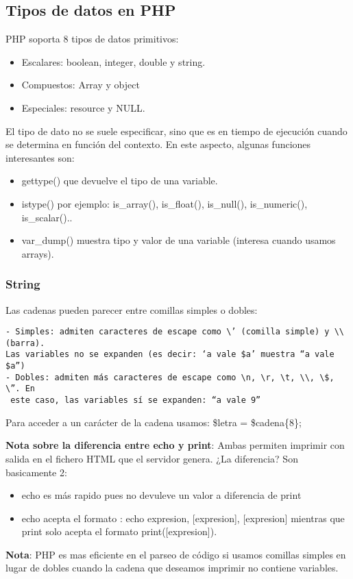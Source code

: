 \documentclass{apuntes}
\begin{document}
\subsection{Tipos de datos en PHP}
PHP soporta 8 tipos de datos primitivos:
\begin{itemize}
\item Escalares: boolean, integer, double y string.
\item Compuestos: Array y object
\item Especiales: resource y NULL.
\end{itemize}
El tipo de dato no se suele especificar, sino que es en tiempo de ejecución cuando se determina en función del contexto. En este aspecto, algunas funciones interesantes son:
\begin{itemize}
\item gettype() que devuelve el tipo de una variable.
\item istype() por ejemplo: is\_array(), is\_float(), is\_null(), is\_numeric(), is\_scalar()..
\item var\_dump() muestra tipo y valor de una variable (interesa cuando usamos arrays).
\end{itemize}

\subsubsection{String}
Las cadenas pueden parecer entre comillas simples o dobles:
\begin{verbatim}
- Simples: admiten caracteres de escape como \’ (comilla simple) y \\ (barra).
Las variables no se expanden (es decir: ‘a vale $a’ muestra “a vale $a”)
- Dobles: admiten más caracteres de escape como \n, \r, \t, \\, \$, \”. En
 este caso, las variables sí se expanden: “a vale 9”
\end{verbatim}

Para acceder a un carácter de la cadena usamos: \$letra = \$cadena\{8\};

\textbf{Nota sobre la diferencia entre echo y print}:
Ambas permiten imprimir con salida en el fichero HTML que el servidor genera. ¿La diferencia? Son basicamente 2:
\begin{itemize}
\item echo es más rapido pues no devuleve un valor a diferencia de print
\item echo acepta el formato : echo expresion, [expresion], [expresion] mientras que print solo acepta el formato print([expresion]).
\end{itemize}
\textbf{Nota}: PHP es mas eficiente en el parseo de código si usamos comillas simples en lugar de dobles cuando la cadena que deseamos imprimir no contiene variables.
\end{document}
